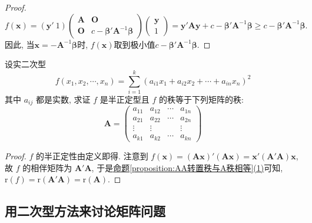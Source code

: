 \documentclass[../../main.tex]{subfiles}%
\begin{document}
\begin{proof}
\[
f(\boldsymbol{x})=(\boldsymbol{y}'\ 1)\begin{pmatrix}
\boldsymbol{A} & \boldsymbol{O} \\
\boldsymbol{O} & c - \boldsymbol{\beta}'\boldsymbol{A}^{-1}\boldsymbol{\beta}
\end{pmatrix}\begin{pmatrix}
\boldsymbol{y} \\
1
\end{pmatrix}=\boldsymbol{y}'\boldsymbol{A}\boldsymbol{y}+c - \boldsymbol{\beta}'\boldsymbol{A}^{-1}\boldsymbol{\beta}\geqslant  c - \boldsymbol{\beta}'\boldsymbol{A}^{-1}\boldsymbol{\beta}.
\]
因此, 当$\boldsymbol{x}=-\boldsymbol{A}^{-1}\boldsymbol{\beta}$时, $f(\boldsymbol{x})$取到极小值$c - \boldsymbol{\beta}'\boldsymbol{A}^{-1}\boldsymbol{\beta}$. 
\end{proof}

\begin{proposition}\label{proposition:和的平方和的半正定型的秩等于其系数矩阵的秩}
设实二次型
\[f(x_1,x_2,\cdots,x_n)=\sum_{i = 1}^{k}(a_{i1}x_1 + a_{i2}x_2 + \cdots + a_{in}x_n)^2\]
其中 \(a_{ij}\) 都是实数, 求证 \(f\) 是半正定型且 \(f\) 的秩等于下列矩阵的秩:
\[
\boldsymbol{A} = \begin{pmatrix}
a_{11} & a_{12} & \cdots & a_{1n} \\
a_{21} & a_{22} & \cdots & a_{2n} \\
\vdots & \vdots & & \vdots \\
a_{k1} & a_{k2} & \cdots & a_{kn}
\end{pmatrix}
\]
\end{proposition}
\begin{proof}
\(f\) 的半正定性由定义即得. 注意到 \(f(\boldsymbol{x}) = (\boldsymbol{A}\boldsymbol{x})'(\boldsymbol{A}\boldsymbol{x}) = \boldsymbol{x}'(\boldsymbol{A}'\boldsymbol{A})\boldsymbol{x}\), 故 \(f\) 的相伴矩阵为 \(\boldsymbol{A}'\boldsymbol{A}\), 于是\hyperref[proposition:AA转置秩与A秩相等]{命题\ref{proposition:AA转置秩与A秩相等}(1)}可知, \(\mathrm{r}(f)=\mathrm{r}(\boldsymbol{A}'\boldsymbol{A})=\mathrm{r}(\boldsymbol{A})\). 
\end{proof}

\subsection{用二次型方法来讨论矩阵问题}
\end{document}
